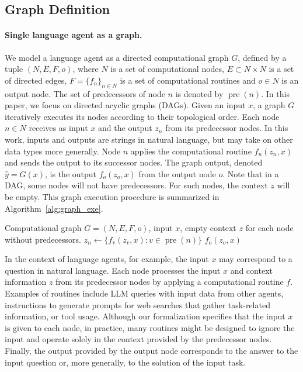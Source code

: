 \documentclass{article}
\DeclareMathOperator{\pre}{pre}
\theoremstyle{plain}
\theoremstyle{definition}
\theoremstyle{remark}
\begin{document}
\subsection{Graph Definition}

\paragraph{Single language agent as a graph.} We model a language agent as a directed computational graph $G$, defined by a tuple $(N, E, F, o)$, where $N$ is a set of computational nodes, $E \subset N \times N$ is a set of directed edges, $F = \{f_n\}_{n\in N}$ is a set of computational routines and $o \in N$ is an output node.
The set of predecessors of node $n$ is denoted by $\pre(n)$.
In this paper, we focus on directed acyclic graphs (DAGs). 
Given an input $x$, a graph $G$ iteratively executes its nodes according to their topological order. 
Each node $n \in N$ receives as input $x$ and the output $z_n$ from its predecessor nodes.
In this work, inputs and outputs are strings in natural language, but may take on other data types more generally.
Node $n$ applies the computational routine $f_n (z_n, x)$ and sends the output to its successor nodes.
The graph output, denoted $\hat{y} = G(x)$, is the output $f_o (z_o, x)$ from the output node $o$.
Note that in a DAG, some nodes will not have predecessors.
For such nodes, the context $z$ will be empty.
This graph execution procedure is summarized in Algorithm~\ref{alg:graph_exe}.

\vspace{-5pt}
\begin{algorithm}[h]
\begin{algorithmic}
\REQUIRE Computational graph $G = (N, E, F, o)$, input $x$, empty context $z$ for each node without predecessors.
\STATE $z_n \leftarrow \{f_v(z_v, x): v \in \pre(n)\}$ 
\ENDFOR
\ENSURE $f_o(z_o, x)$
\end{algorithmic}
\caption{Graph Execution}\label{alg:graph_exe}
\end{algorithm}

In the context of language agents, for example, the input $x$ may correspond to a question in natural language.
Each node processes the input $x$ and context information $z$ from its predecessor nodes by applying a computational routine $f$.
Examples of routines include LLM queries with input data from other agents, instructions to generate prompts for web searches that gather task-related information, or tool usage.
Although our formalization specifies that the input $x$ is given to each node, in practice, many routines might be designed to ignore the input and operate solely in the context provided by the predecessor nodes.
Finally, the output provided by the output node corresponds to the answer to the input question or, more generally, to the solution of the input task. 
\end{document}
